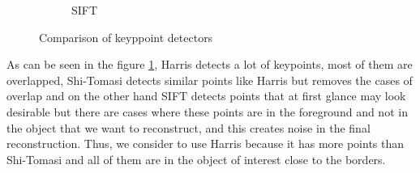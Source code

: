\begin{figure}[!h]
\begin{subfigure}{0.5\textwidth}
        \caption{SIFT}
      \end{subfigure}
       \caption{Comparison of keyppoint detectors}
	\label{fig:comparison-keypoints}
\end{figure}

As can be seen in the figure \ref{fig:comparison-keypoints}, Harris detects a lot of keypoints, most of them are overlapped, Shi-Tomasi detects similar points like Harris but removes the cases of overlap and on the other hand SIFT detects points that at first glance may look desirable but there are cases where these points are in the foreground and not in the object that we want to reconstruct, and this creates noise in the final reconstruction. Thus, we consider to use Harris because it has more points than Shi-Tomasi and all of them are in the object of interest close to the borders.

